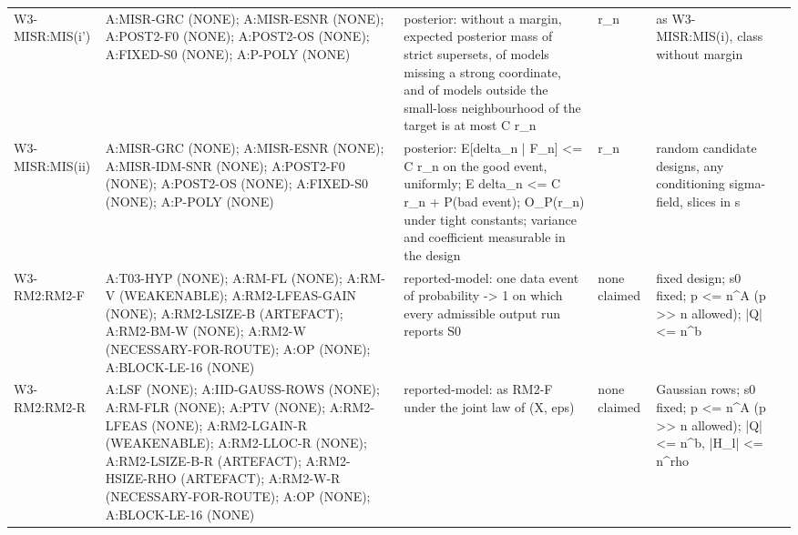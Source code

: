 \begin{longtable}{p{2.2cm}p{4.2cm}p{3cm}p{1.6cm}p{2.6cm}p{1.6cm}}
W3-MISR:MIS(i') & A:MISR-GRC (NONE); A:MISR-ESNR (NONE); A:POST2-F0 (NONE); A:POST2-OS (NONE); A:FIXED-S0 (NONE); A:P-POLY (NONE) & posterior: without a margin, expected posterior mass of strict supersets, of models missing a strong coordinate, and of models outside the small-loss neighbourhood of the target is at most C r\_n & r\_n & as W3-MISR:MIS(i), class without margin &  \\
W3-MISR:MIS(ii) & A:MISR-GRC (NONE); A:MISR-ESNR (NONE); A:MISR-IDM-SNR (NONE); A:POST2-F0 (NONE); A:POST2-OS (NONE); A:FIXED-S0 (NONE); A:P-POLY (NONE) & posterior: E[delta\_n | F\_n] <= C r\_n on the good event, uniformly; E delta\_n <= C r\_n + P(bad event); O\_P(r\_n) under tight constants; variance and coefficient measurable in the design & r\_n & random candidate designs, any conditioning sigma-field, slices in s &  \\
W3-RM2:RM2-F & A:T03-HYP (NONE); A:RM-FL (NONE); A:RM-V (WEAKENABLE); A:RM2-LFEAS-GAIN (NONE); A:RM2-LSIZE-B (ARTEFACT); A:RM2-BM-W (NONE); A:RM2-W (NECESSARY-FOR-ROUTE); A:OP (NONE); A:BLOCK-LE-16 (NONE) & reported-model: one data event of probability -> 1 on which every admissible output run reports S0 & none claimed & fixed design; s0 fixed; p <= n\^{}A (p >> n allowed); |Q| <= n\^{}b &  \\
W3-RM2:RM2-R & A:LSF (NONE); A:IID-GAUSS-ROWS (NONE); A:RM-FLR (NONE); A:PTV (NONE); A:RM2-LFEAS (NONE); A:RM2-LGAIN-R (WEAKENABLE); A:RM2-LLOC-R (NONE); A:RM2-LSIZE-B-R (ARTEFACT); A:RM2-HSIZE-RHO (ARTEFACT); A:RM2-W-R (NECESSARY-FOR-ROUTE); A:OP (NONE); A:BLOCK-LE-16 (NONE) & reported-model: as RM2-F under the joint law of (X, eps) & none claimed & Gaussian rows; s0 fixed; p <= n\^{}A (p >> n allowed); |Q| <= n\^{}b, |H\_l| <= n\^{}rho &  \\
\end{longtable}
